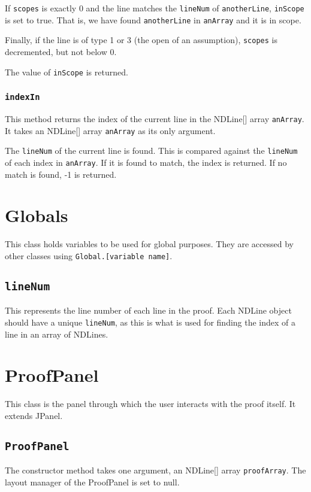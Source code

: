 \documentclass[a4paper]{article}
\begin{document}
If \texttt{scopes} is exactly 0 and the line matches the \texttt{lineNum} of \texttt{anotherLine}, \texttt{inScope} is set to true. That is, we have found \texttt{anotherLine} in \texttt{anArray} and it is in scope. 

Finally, if the line is of type 1 or 3 (the open of an assumption), \texttt{scopes} is decremented, but not below 0.

The value of \texttt{inScope} is returned.

\subsubsection{\texttt{indexIn}}
This method returns the index of the current line in the NDLine[] array \texttt{anArray}. It takes an NDLine[] array \texttt{anArray} as its only argument.

The \texttt{lineNum} of the current line is found. This is compared against the \texttt{lineNum} of each index in \texttt{anArray}. If it is found to match, the index is returned. If no match is found, -1 is returned.


\section{Globals}
This class holds variables to be used for global purposes. They are accessed by other classes using \texttt{Global.[variable name]}.

\subsection{\texttt{lineNum}}
This represents the line number of each line in the proof. Each NDLine object should have a unique \texttt{lineNum}, as this is what is used for finding the index of a line in an array of NDLines.

\section{ProofPanel}
This class is the panel through which the user interacts with the proof itself. It extends JPanel.

\subsection{\texttt{ProofPanel}}
The constructor method takes one argument, an NDLine[] array \texttt{proofArray}. The layout manager of the ProofPanel is set to null. 
\end{document}
